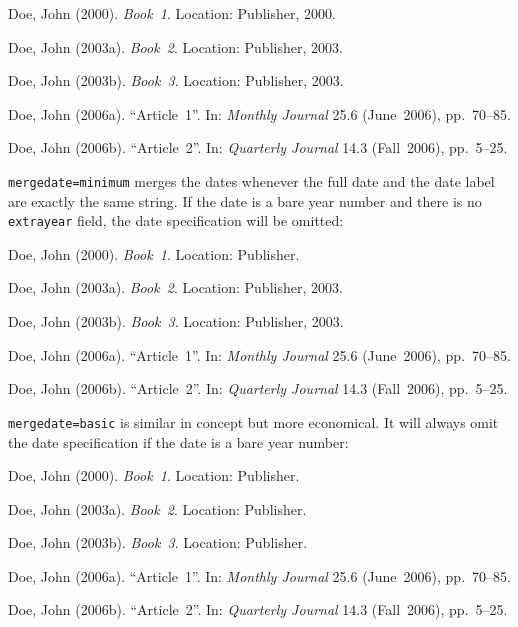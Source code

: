 \documentclass[a4paper]{article}
\newenvironment{bibsample}
  {\trivlist\samepage
   \setlength{\itemsep}{0pt}}
  {\endtrivlist}
\begin{document}
\begin{bibsample}
\item Doe, John (2000). \emph{Book~1}. Location: Publisher, 2000.
\item Doe, John (2003a). \emph{Book~2}. Location: Publisher, 2003.
\item Doe, John (2003b). \emph{Book~3}. Location: Publisher, 2003.
\item Doe, John (2006a). \enquote{Article~1}. In: \emph{Monthly Journal} 25.6
(June~2006), pp.~70--85.
\item Doe, John (2006b). \enquote{Article~2}. In: \emph{Quarterly Journal} 14.3
(Fall~2006), pp.~5--25.
\end{bibsample}

\texttt{mergedate=minimum} merges the dates whenever the full date
and the date label are exactly the same string. If the date is a bare
year number and there is no \texttt{extrayear} field, the date
specification will be omitted:

\begin{bibsample}
\item Doe, John (2000). \emph{Book~1}. Location: Publisher.
\item Doe, John (2003a). \emph{Book~2}. Location: Publisher, 2003.
\item Doe, John (2003b). \emph{Book~3}. Location: Publisher, 2003.
\item Doe, John (2006a). \enquote{Article~1}. In: \emph{Monthly Journal} 25.6
(June~2006), pp.~70--85.
\item Doe, John (2006b). \enquote{Article~2}. In: \emph{Quarterly Journal} 14.3
(Fall~2006), pp.~5--25.
\end{bibsample}

\texttt{mergedate=basic} is similar in concept but more economical.
It will always omit the date specification if the date is a bare year
number:

\begin{bibsample}
\item Doe, John (2000). \emph{Book~1}. Location: Publisher.
\item Doe, John (2003a). \emph{Book~2}. Location: Publisher.
\item Doe, John (2003b). \emph{Book~3}. Location: Publisher.
\item Doe, John (2006a). \enquote{Article~1}. In: \emph{Monthly Journal} 25.6
(June~2006), pp.~70--85.
\item Doe, John (2006b). \enquote{Article~2}. In: \emph{Quarterly Journal} 14.3
(Fall~2006), pp.~5--25.
\end{bibsample}
\end{document}
